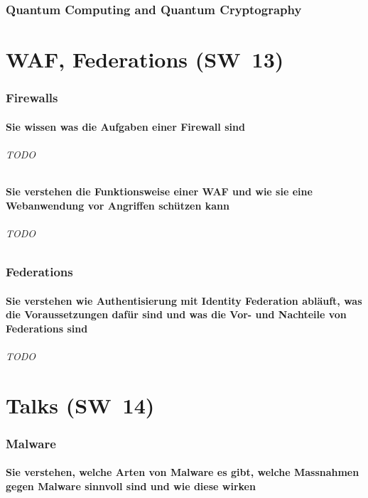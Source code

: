 \documentclass[10pt,a4paper]{article}
\begin{document}
\section{Quantum Computing and Quantum Cryptography}
\part{WAF, Federations (SW~13)}
\section{Firewalls}
\subsection*{Sie wissen was die Aufgaben einer Firewall sind}
\paragraph*{TODO}
\subsection*{Sie verstehen die Funktionsweise einer WAF und wie sie eine Webanwendung vor Angriffen schützen kann}
\paragraph*{TODO}

\section{Federations}
\subsection*{Sie verstehen wie Authentisierung mit Identity Federation abläuft, was die Voraussetzungen dafür sind und was die Vor- und Nachteile von Federations sind}
\paragraph*{TODO}

\part{Talks (SW~14)}
\section{Malware}
\subsection*{Sie verstehen, welche Arten von Malware es gibt, welche Massnahmen gegen Malware sinnvoll sind und wie diese wirken}
\end{document}
